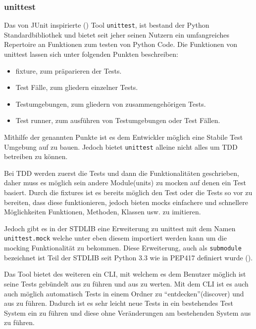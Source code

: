 \subsubsection{unittest}\label{python-tools:unittest}

Das von JUnit inspirierte (\cite{docs.python:unittest}) Tool \lstinline|unittest|, ist bestand
der Python Standardbibliothek und bietet seit jeher seinen Nutzern ein umfangreiches
Repertoire an Funktionen zum testen von Python Code.
\noindent
Die Funktionen von unittest lassen sich unter folgenden Punkten beschreiben:
\begin{itemize}
    \item \Gls{fixture}, zum präparieren der Tests.
    \item Test Fälle, zum gliedern einzelner Tests.
    \item Testumgebungen, zum gliedern von zusammengehörigen Tests.
    \item Test runner, zum ausführen von Testumgebungen oder Test Fällen.
\end{itemize}
\noindent
Mithilfe der genannten Punkte ist es dem Entwickler möglich eine Stabile Test Umgebung
auf zu bauen. Jedoch bietet \lstinline{unittest} alleine nicht alles um TDD betreiben zu können.

Bei TDD werden zuerst die Tests und dann die Funktionalitäten geschrieben, daher
muss es möglich sein andere Module(units) zu \gls{mock}en auf denen ein Test basiert.
Durch die \Glspl{fixture} ist es bereits möglich den Test oder die Tests so vor zu
bereiten, dass diese funktionieren, jedoch bieten \Glspl{mock} einfachere und
schnellere Möglichkeiten Funktionen, Methoden, Klassen usw. zu imitieren.

Jedoch gibt es in der STDLIB eine Erweiterung zu unittest mit dem Namen
\lstinline|unittest.mock| welche unter eben diesem importiert werden kann um die 
\gls{mock}ing Funktionalität zu bekommen. Diese Erweiterung, auch als \lstinline|submodule|
bezeichnet ist Teil der STDLIB seit Python 3.3 wie in PEP417
definiert wurde (\cite{python.org:PEP417}).

Das Tool bietet des weiteren ein CLI, mit welchem es dem Benutzer möglich ist
seine Tests gebündelt aus zu führen und aus zu werten. Mit dem CLI ist es auch
auch möglich automatisch Tests in einem Ordner zu "`entdecken"'(discover) und
aus zu führen. Dadurch ist es sehr leicht neue Tests in ein bestehendes Test
System ein zu führen und diese ohne Veränderungen am bestehenden System aus zu
führen.

